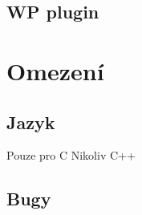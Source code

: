\documentclass[11pt]{beamer}
\begin{document}
\subsection{WP plugin}

\section{Omezení}
\subsection{Jazyk}
\begin{frame}{Pouze pro C}
Nikoliv C++
\end{frame}
\subsection{Bugy}
\end{document}
